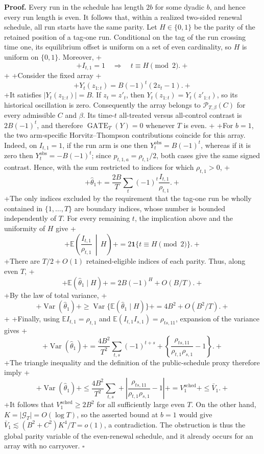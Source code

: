 \textbf{Proof.} Every run in the schedule has length \(2b\) for some dyadic \(b\), and hence every run length is even. It follows that, within a realized two-sided renewal schedule, all run starts have the same parity. Let \(H\in\{0,1\}\) be the parity of the retained position of a tag-one run. Conditional on the tag of the run crossing time one, its equilibrium offset is uniform on a set of even cardinality, so \(H\) is uniform on \(\{0,1\}\). Moreover,
+\[
+ I_{t,1}=1\quad\Longrightarrow\quad t\equiv H\pmod 2.
+\]
+
+Consider the fixed array
+\[
+ Y_t(z_{1:t})=B(-1)^t(2z_t-1).
+\]
+It satisfies \(\lvert Y_t(z_{1:t})\rvert=B\). If \(z_t=z'_t\), then \(Y_t(z_{1:t})=Y_t(z'_{1:t})\), so its historical oscillation is zero. Consequently the array belongs to \(\mathcal P_{T,\beta}(C)\) for every admissible \(C\) and \(\beta\). Its time-\(t\) all-treated versus all-control contrast is \(2B(-1)^t\), and therefore \(\operatorname{GATE}_T(Y)=0\) whenever \(T\) is even.
+
+For \(b=1\), the two arm-specific Horvitz--Thompson contributions coincide for this array. Indeed, on \(I_{t,1}=1\), if the run arm is one then \(Y_t^{\mathrm{obs}}=B(-1)^t\), whereas if it is zero then \(Y_t^{\mathrm{obs}}=-B(-1)^t\); since \(p_{t,1,a}=\rho_{t,1}/2\), both cases give the same signed contrast. Hence, with the sum restricted to indices for which \(\rho_{t,1}>0\),
+\[
+ \widehat\theta_1
+ =\frac{2B}{T}\sum_t(-1)^t\frac{I_{t,1}}{\rho_{t,1}}.
+\]
+The only indices excluded by the requirement that the tag-one run be wholly contained in \(\{1,\ldots,T\}\) are boundary indices, whose number is bounded independently of \(T\). For every remaining \(t\), the implication above and the uniformity of \(H\) give
+\[
+ \mathbb E\!\left(\frac{I_{t,1}}{\rho_{t,1}}\,\middle|\,H\right)
+ =2\mathbf 1\{t\equiv H\pmod 2\}.
+\]
+There are \(T/2+O(1)\) retained-eligible indices of each parity. Thus, along even \(T\),
+\[
+ \mathbb E(\widehat\theta_1\mid H)
+ =2B(-1)^H+O(B/T).
+\]
+By the law of total variance,
+\[
+ \operatorname{Var}(\widehat\theta_1)
+ \ge \operatorname{Var}\{\mathbb E(\widehat\theta_1\mid H)\}
+ =4B^2+O(B^2/T).
+\]
+
+Finally, using \(\mathbb E I_{t,1}=\rho_{t,1}\) and \(\mathbb E(I_{t,1}I_{s,1})=\rho_{ts,11}\), expansion of the variance gives
+\[
+ \operatorname{Var}(\widehat\theta_1)
+ =\frac{4B^2}{T^2}\sum_{t,s}(-1)^{t+s}
+ \left\{\frac{\rho_{ts,11}}{\rho_{t,1}\rho_{s,1}}-1\right\}.
+\]
+The triangle inequality and the definition of the public-schedule proxy therefore imply
+\[
+ \operatorname{Var}(\widehat\theta_1)
+ \le \frac{4B^2}{T^2}\sum_{t,s}
+ \left|\frac{\rho_{ts,11}}{\rho_{t,1}\rho_{s,1}}-1\right|
+ =V_1^{\mathrm{sched}}
+ \le \bar V_1.
+\]
+It follows that \(V_1^{\mathrm{sched}}\ge 2B^2\) for all sufficiently large even \(T\). On the other hand, \(K=\lvert\mathcal G_T\rvert=O(\log T)\), so the asserted bound at \(b=1\) would give \(\bar V_1\lesssim(B^2+C^2)K^4/T=o(1)\), a contradiction. The obstruction is thus the global parity variable of the even-renewal schedule, and it already occurs for an array with no carryover. \(\square\)